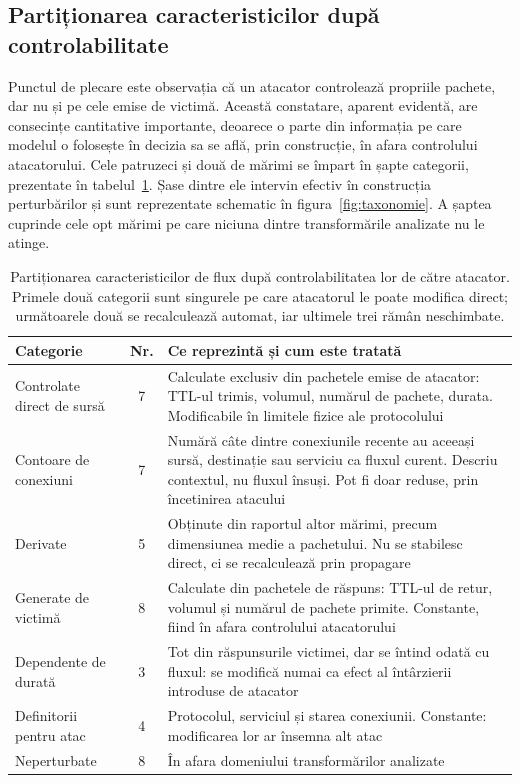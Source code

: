 \subsection{Partiționarea caracteristicilor după controlabilitate}\label{subsec:taxonomie}

Punctul de plecare este observația că un atacator controlează propriile pachete, dar nu și pe cele emise de victimă. Această constatare, aparent evidentă, are consecințe cantitative importante, deoarece o parte din informația pe care modelul o folosește în decizia sa se află, prin construcție, în afara controlului atacatorului. Cele patruzeci și două de mărimi se împart în șapte categorii, prezentate în tabelul~\ref{tab:taxonomie}. Șase dintre ele intervin efectiv în construcția perturbărilor și sunt reprezentate schematic în figura~\ref{fig:taxonomie}. A șaptea cuprinde cele opt mărimi pe care niciuna dintre transformările analizate nu le atinge.

\begin{table}[!ht]
    \centering
    \begin{tabular}{|l|c|p{7.2cm}|}
        \hline
        \textbf{Categorie} & \textbf{Nr.} & \textbf{Ce reprezintă și cum este tratată} \\
        \hline
        Controlate direct de sursă & 7 & Calculate exclusiv din pachetele emise de atacator: TTL-ul trimis, volumul, numărul de pachete, durata. Modificabile în limitele fizice ale protocolului \\
        \hline
        Contoare de conexiuni & 7 & Numără câte dintre conexiunile recente au aceeași sursă, destinație sau serviciu ca fluxul curent. Descriu contextul, nu fluxul însuși. Pot fi doar reduse, prin încetinirea atacului \\
        \hline
        Derivate & 5 & Obținute din raportul altor mărimi, precum dimensiunea medie a pachetului. Nu se stabilesc direct, ci se recalculează prin propagare \\
        \hline
        Generate de victimă & 8 & Calculate din pachetele de răspuns: TTL-ul de retur, volumul și numărul de pachete primite. Constante, fiind în afara controlului atacatorului \\
        \hline
        Dependente de durată & 3 & Tot din răspunsurile victimei, dar se întind odată cu fluxul: se modifică numai ca efect al întârzierii introduse de atacator \\
        \hline
        Definitorii pentru atac & 4 & Protocolul, serviciul și starea conexiunii. Constante: modificarea lor ar însemna alt atac \\
        \hline
        Neperturbate & 8 & În afara domeniului transformărilor analizate \\
        \hline
    \end{tabular}
    \caption{Partiționarea caracteristicilor de flux după controlabilitatea lor de către atacator. Primele două categorii sunt singurele pe care atacatorul le poate modifica direct; următoarele două se recalculează automat, iar ultimele trei rămân neschimbate.}
    \label{tab:taxonomie}
\end{table}

